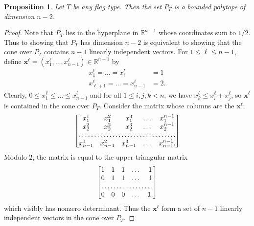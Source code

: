 \documentclass[letterpaper,10pt]{amsart}
\newcommand{\RR}{\mathbb{R}}      %
\newtheorem{proposition}[theorem]{Proposition}
\theoremstyle{definition}
\theoremstyle{remark}
\begin{document}
\begin{proposition}
\label{prop:dim}
Let $T$ be any flag type. Then the set $P_T$ is a bounded polytope of dimension $n-2$.
\end{proposition}
\begin{proof}
Note that $P_T$ lies in the hyperplane in $\RR^{n-1}$ whose coordinates sum to $1/2$. Thus to showing that $P_T$ has dimension $n-2$ is equivalent to showing that the cone over $P_T$ contains $n-1$ linearly independent vectors. For $1 \leq \ell \leq n-1$, define $\mathbf{x}^\ell = (x_1^\ell,\dots,x_{n-1}^\ell) \in \RR^{n-1}$ by
\begin{align*}
x_1^\ell = \dots = x_\ell^\ell &= 1 \\
x_{\ell+1}^\ell = \dots = x_{n-1}^\ell &= 2.
\end{align*}
Clearly, $0 \leq x_1^{\ell} \leq \dots \leq x_{n-1}^{\ell}$ and for all $1 \leq i,j,k < n$, we have $x_k^\ell \leq x_i^\ell + x_j^\ell$, so $\mathbf{x}^\ell$ is contained in the cone over $P_T$. Consider the matrix whose columns are the $\mathbf{x}^{\ell}$:
\[
\begin{bmatrix}
    x_1^{1}       & x_1^2 & x_{1}^3 & \dots & x_{1}^{n-1} \\
    x_{2}^2       & x_{2}^2 & x_{2}^3 & \dots & x_{2}^{n-1} \\
    \hdotsfor{5} \\
    x_{n-1}^1       & x_{n-1}^2 & x_{n-1}^3 & \dots & x_{n-1}^{n-1}.
\end{bmatrix}
\]
Modulo $2$, the matrix is equal to the upper triangular matrix
\[
\begin{bmatrix}
    1       & 1 & 1& \dots & 1 \\
    0       & 1 & 1 & \dots & 1 \\
    \hdotsfor{5} \\
    0       & 0 & 0 & \dots & 1.
\end{bmatrix} 
\]
which visibly has nonzero determinant. Thus the $\mathbf{x}^\ell$ form a set of $n-1$ linearly independent vectors in the cone over $P_T$. 
\end{proof}
\end{document}
